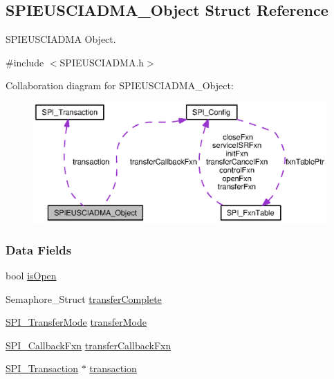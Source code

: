 \subsection{S\-P\-I\-E\-U\-S\-C\-I\-A\-D\-M\-A\-\_\-\-Object Struct Reference}
\label{struct_s_p_i_e_u_s_c_i_a_d_m_a___object}


S\-P\-I\-E\-U\-S\-C\-I\-A\-D\-M\-A Object.  




{\ttfamily \#include $<$S\-P\-I\-E\-U\-S\-C\-I\-A\-D\-M\-A.\-h$>$}



Collaboration diagram for S\-P\-I\-E\-U\-S\-C\-I\-A\-D\-M\-A\-\_\-\-Object\-:
\nopagebreak
\begin{figure}[H]
\begin{center}
\leavevmode
\includegraphics[width=350pt]{struct_s_p_i_e_u_s_c_i_a_d_m_a___object__coll__graph}
\end{center}
\end{figure}
\subsubsection*{Data Fields}
\begin{DoxyCompactItemize}
\item 
bool \hyperlink{struct_s_p_i_e_u_s_c_i_a_d_m_a___object_ad4ba79fb72b84c9e2921c2f3cd41376d}{is\-Open}
\item 
Semaphore\-\_\-\-Struct \hyperlink{struct_s_p_i_e_u_s_c_i_a_d_m_a___object_a021acd9681aee074ddb2cd09d096eaf1}{transfer\-Complete}
\item 
\hyperlink{_s_p_i_8h_ab9ea76c6529d6076eee5e1c4a5a92c6f}{S\-P\-I\-\_\-\-Transfer\-Mode} \hyperlink{struct_s_p_i_e_u_s_c_i_a_d_m_a___object_a7b0e5739357968e12886c109b465d68a}{transfer\-Mode}
\item 
\hyperlink{_s_p_i_8h_aeb03e7608a14021c3b0acf92c90e2168}{S\-P\-I\-\_\-\-Callback\-Fxn} \hyperlink{struct_s_p_i_e_u_s_c_i_a_d_m_a___object_affae46790dac7c7f45301ec41404bfd0}{transfer\-Callback\-Fxn}
\item 
\hyperlink{struct_s_p_i___transaction}{S\-P\-I\-\_\-\-Transaction} $\ast$ \hyperlink{struct_s_p_i_e_u_s_c_i_a_d_m_a___object_af400fd7340d7319ad5334ffa9a4f0f36}{transaction}
\end{DoxyCompactItemize}



